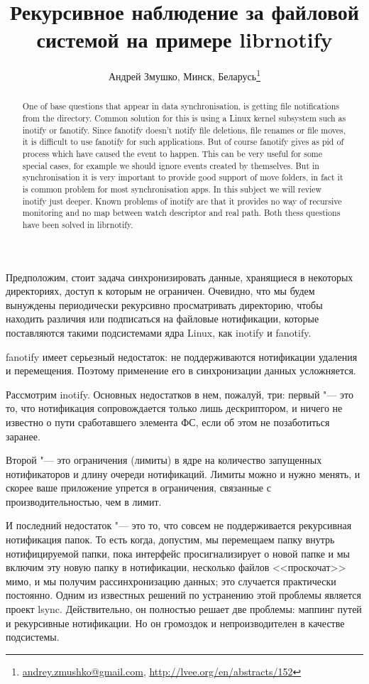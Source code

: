 \documentclass[10pt, a5paper]{article}
\begin{document}
\title{Рекурсивное наблюдение за файловой системой на примере librnotify}
\author{Андрей Змушко, Минск, Беларусь\footnote{\url{andrey.zmushko@gmail.com}, \url{http://lvee.org/en/abstracts/152}}}
\maketitle
\begin{abstract}
One of base questions that appear in data synchronisation, is getting file notifications from the directory. Common solution for this is using a Linux kernel subsystem such as inotify or fanotify. Since fanotify doesn't notify file deletions, file renames or file moves, it is difficult to use fanotify for such applications. But of course fanotify gives as pid of process which have caused the event to happen. This can be very useful for some special cases, for example we should ignore events created by themselves. But in synchronisation it is very important to provide good support of move folders, in fact it is common problem for most synchronisation apps. In this subject we will review inotify just deeper. Known problems of inotify are that it provides no way of recursive monitoring and no map between watch descriptor and real path. Both thess questions have been solved in librnotify. 
\end{abstract}
Предположим, стоит задача синхронизировать данные, хранящиеся в некоторых директориях, доступ к которым не ограничен. Очевидно, что мы будем вынуждены периодически рекурсивно просматривать директорию, чтобы находить различия или подписаться на файловые нотификации, которые поставляются такими подсистемами ядра Linux, как inotify и fanotify.

fanotify имеет серьезный недостаток: не поддерживаются нотификации удаления и перемещения. 
Поэтому применение его в синхронизации данных усложняется. 

Рассмотрим inotify. Основных недостатков в нем, пожалуй, три: первый "--- это то, что нотификация сопровождается только лишь  
дескриптором, и ничего не известно о пути сработавшего элемента ФС, если об этом не позаботиться заранее. 

Второй "--- это ограничения (лимиты) 
в ядре на количество запущенных нотификаторов и длину очереди нотификаций. Лимиты можно и нужно менять, и скорее ваше приложение упрется в ограничения, связанные с производительностью, чем в лимит.  

И последний недостаток "--- это то, что совсем не поддерживается рекурсивная нотификация папок.  
То есть когда, допустим, мы перемещаем папку внутрь нотифицируемой папки, пока интерфейс просигнализирует о новой папке и мы включим эту новую папку в нотификации, 
 несколько файлов <<проскочат>> мимо, и мы получим рассинхронизацию данных; это случается практически постоянно. 
Одним из известных решений по устранению этой проблемы является проект lsync. Действительно, он полностью решает две проблемы: маппинг путей и рекурсивные нотификации. Но он громоздок и непроизводителен в качестве подсистемы. 
\end{document}
